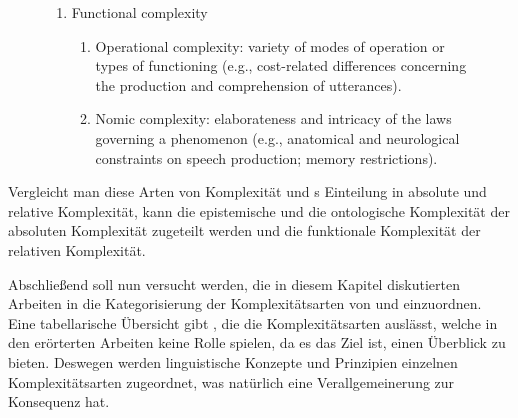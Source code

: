 \begin{figure}
{{\begin{enumerate}[label=\arabic*.,listparindent=0pt,leftmargin=.5cm,rightmargin=.5cm]
\begin{enumerate}[label=\Alph*.]
\begin{enumerate}[label=\alph*.]
		\end{enumerate}
		\item Structural complexity
		\begin{enumerate}[label=\alph*.]
			\item Organizational complexity: variety of ways of arranging components in different modes of interrelationship (e.g., phonotactic restrictions, variety of distinctive word orders).
			\item Hierarchical complexity: elaborateness of subordination relationships in the modes of inclusion and subsumption (e.g., recursion, intermediate levels in lexical-semantic hierarchies).
		\end{enumerate}
	\end{enumerate}
\item Functional complexity
	\begin{enumerate}[label=\Alph*.]
		\item Operational complexity: variety of modes of operation or types of functioning (e.g., cost-related differences concerning the production and comprehension of utterances).
		\item Nomic complexity: elaborateness and intricacy of the laws governing a phenomenon (e.g., anatomical and neurological constraints on speech production; memory restrictions).
	\end{enumerate}
\end{enumerate}}}
\end{figure}

Vergleicht man diese Arten von Komplexität und \citeauthor{Miestamo2008}s \citeyearpar{Miestamo2008} Einteilung in absolute und relative Komplexität, kann die epistemische und die ontologische Komplexität der absoluten Komplexität zugeteilt werden und die funktionale Komplexität der relativen Komplexität.

Abschließend soll nun versucht werden, die in diesem Kapitel diskutierten Arbeiten in die Kategorisierung der Komplexitätsarten von \citet{Rescher1998} und \citet{Sinnemäki2011} einzuordnen. Eine tabellarische Übersicht gibt , die die Komplexitätsarten auslässt, welche in den erörterten Arbeiten keine Rolle spielen, da es das Ziel ist, einen Überblick zu bieten. Deswegen werden linguistische Konzepte und Prinzipien einzelnen Komplexitätsarten zugeordnet, was natürlich eine Verallgemeinerung zur Konsequenz hat.

